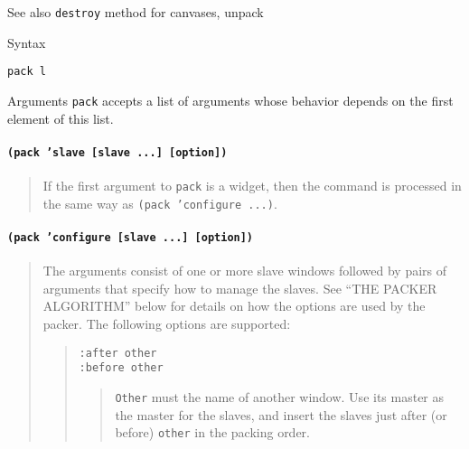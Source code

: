 \begin{schemedoc}{See also}
{\tt destroy} method for canvases, unpack
\end{schemedoc}

%
%

\label{pack-doc}
\begin{schemedoc}{Syntax}
\begin{verbatim}
pack l 
\end{verbatim}
\end{schemedoc}

\begin{schemedoc}{Arguments}
{\tt pack} accepts a list of arguments whose behavior depends on the first
element of this list.

\paragraph{\tt (pack 'slave [slave ...] [option])}
\begin{quote}
If the first argument to {\tt pack} is a widget, then the command is
processed in the same way as {\tt (pack 'configure ...)}.
\end{quote}

\paragraph{\tt (pack 'configure [slave ...] [option])}

\begin{quote}
The arguments consist of one or more slave windows followed by pairs of
arguments that specify how to manage the slaves.  See ``THE PACKER
ALGORITHM'' below for details on how the options are used by the packer.
The following options are supported:
\begin{quote}
\par
{\tt :after  other}\\
{\tt :before other}
        \begin{quote}
                     {\tt Other} must the name of another window.   Use
                     its master as the master for the slaves, and
                     insert the slaves just after (or before)  {\tt other} 
                     in  the packing order.
        \end{quote}


\end{quote}
\end{quote}
\end{schemedoc}
